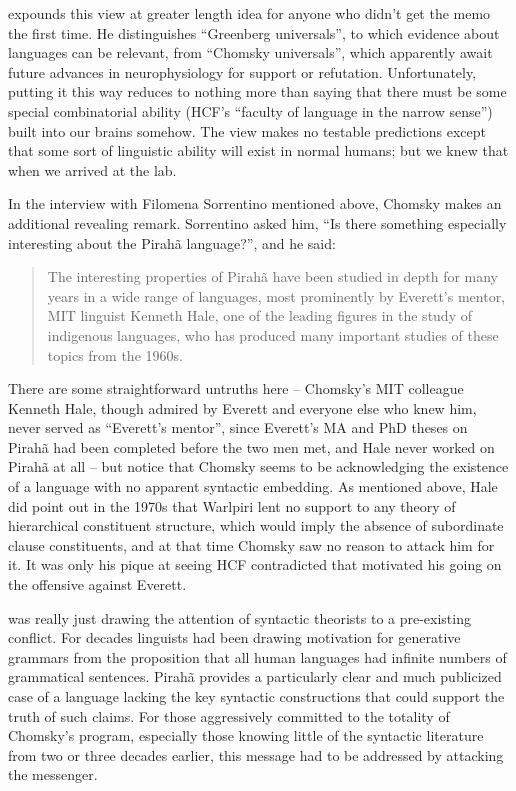\documentclass[output=paper,colorlinks,citecolor=brown
]{langscibook}
\begin{document}
\citet[792--794]{Hornstein19} expounds this view at
greater length idea for anyone who didn't get the memo the first time.
He distinguishes ``Greenberg universals'', to which evidence about languages
can be relevant, from ``Chomsky universals'', which apparently await future
advances in neurophysiology for support or refutation. Unfortunately,
putting it this way reduces to nothing more than saying that there
must be some special combinatorial ability (HCF's ``faculty of language
in the narrow sense'') built into our brains somehow. The view makes no
testable predictions except that some sort of linguistic ability will
exist in normal humans; but we knew that when we arrived at the lab.

In the interview with Filomena Sorrentino mentioned above, Chomsky makes
an additional revealing remark.  Sorrentino asked him, ``Is there something
especially interesting about the Pirahã language?'', and he said:
\begin{quote}
The interesting properties of Pirahã have been studied in depth for
many years in a wide range of languages, most prominently by Everett's
mentor, MIT linguist Kenneth Hale, one of the leading figures in the
study of indigenous languages, who has produced many important studies
of these topics from the 1960s.
\end{quote}
There are some straightforward untruths here -- Chomsky's MIT colleague
Kenneth Hale, though admired by Everett and everyone else who knew him,
never served as ``Everett's mentor'', since Everett's MA and PhD theses on
Pirahã had been completed before the two men met, and Hale never
worked on Pirahã at all -- but notice that Chomsky seems to be
acknowledging the existence of a language with no apparent syntactic
embedding. As mentioned above, Hale did point out in the 1970s that
Warlpiri lent no support to any theory of hierarchical constituent
structure, which would imply the absence of subordinate clause
constituents, and at that time Chomsky saw no reason to attack him
for it. It was only his pique at seeing HCF contradicted that motivated
his going on the offensive against Everett.

\citet{Everett05} was really just drawing the attention of syntactic
theorists to a pre-existing conflict. For decades linguists had been
drawing motivation for generative grammars from the proposition that
all human languages had infinite numbers of grammatical sentences.
Pirahã provides a particularly clear and much publicized case of
a language lacking the key syntactic constructions that could support
the truth of such claims. For those aggressively committed to the
totality of Chomsky's program, especially those knowing little of the
syntactic literature from two or three decades earlier, this message
had to be addressed by attacking the messenger.
\end{document}
